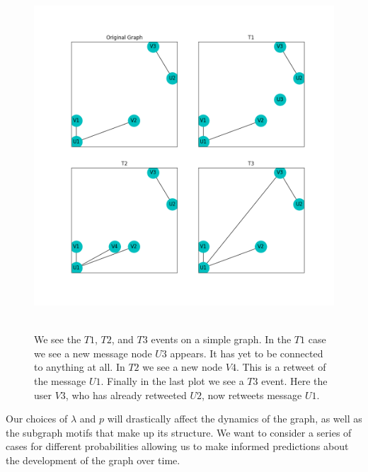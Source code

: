 \begin{figure}
    \includegraphics[width=12cm]{Images/events.png}\
    \centering
    \caption{We see the $T1$, $T2$, and $T3$ events on a simple graph. In the $T1$ case 
    we see a new message node $U3$ appears. It has yet to be connected to anything at all. In $T2$
    we see a new node $V4$. This is a retweet of the message $U1$. Finally in the last plot we see
    a $T3$ event. Here the user $V3$, who has already retweeted $U2$, now retweets message $U1$.}
\end{figure}

Our choices of $\lambda$ and $p$ will drastically affect the dynamics of the graph, as well as the subgraph motifs that make
up its structure. We want to consider a series of cases for different probabilities allowing us to make informed predictions about the development
of the graph over time.


